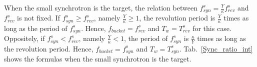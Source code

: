 
When the small synchrotron is the target, the relation between $f_{\mathit{syn}}^{s}=\frac{Y}{\kappa}f_{\mathit{rev}}^{s}$ and $f_{\mathit{rev}}^{s}$ is not fixed. If $f_{\mathit{syn}}^{s}\ge f_{\mathit{rev}}^{s}$, namely $\frac{Y}{\kappa}\ge 1$, the revolution period is $\frac{Y}{\kappa}$ times as long as the period of $f_{\mathit{syn}}^{s}$. Hence, $f_\mathit{bucket}=f_{\mathit{rev}}^{s}$ and $T_w=T_{\mathit{rev}}^{s}$ for this case.
Oppositely,  if $f_{\mathit{syn}}^{s}<f_{\mathit{rev}}^{s}$, namely $\frac{Y}{\kappa}<1$, the period of $f_{\mathit{syn}}^{s}$ is $\frac{\kappa}{Y}$ times as long as the revolution period. Hence, $f_\mathit{bucket}=f_{\mathit{syn}}^{s}$ and $T_w=T_{\mathit{syn}}^{s}$. Tab.~\ref{Sync_ratio_int} shows the formulas when the small synchrotron is the target.

